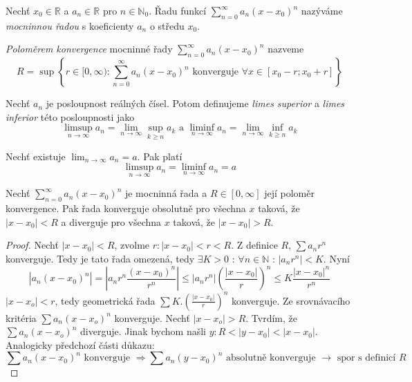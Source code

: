 \begin{definice}
Nechť $x_0 \in \mathbb{R}$ a $a_n \in \mathbb{R}$ pro $n \in \mathbb{N}_0$. Řadu funkcí $\sum_{n=0}^{\infty} a_n (x-x_0)^n$ nazýváme \emph{mocninnou řadou} s koeficienty $a_n$ o středu $x_0$.
\end{definice}

\begin{definice}
\emph{Poloměrem konvergence} mocninné řady $\sum_{n=0}^{\infty} a_n (x-x_0)^n$ nazveme $$R = \sup \left\{ r \in [ 0,\infty ) : \sum_{n=0}^{\infty}  a_n ( x - x_0 )^n \textrm{ konverguje } \forall x \in [ x_0 - r; x_0 + r ] \right\}$$
\end{definice}

\begin{definice}
Nechť $a_n$ je posloupnost reálných čísel. Potom definujeme \emph{limes superior} a \emph{limes inferior} této posloupnosti jako
$$\limsup_{n \to \infty} a_n = \lim_{n \to \infty} \sup_{k \geq n} a_k \textrm{ a } \liminf_{n \to \infty} a_n = \lim_{n \to \infty} \inf_{k \geq n} a_k$$
\end{definice}

\begin{poznamka}
Nechť existuje $\lim_{n \to \infty} a_n = a$. Pak platí
$$\limsup_{n \to \infty} a_n = \liminf_{n \to \infty} a_n = a$$
\end{poznamka}

\begin{vetal}
\label{o poloměru konvergence mocninné řady}
Nechť $\sum_{n=0}^{\infty} a_n (x-x_0)^n$ je mocninná řada a $R \in [ 0, \infty ]$ její poloměr konvergence. Pak řada konverguje obsolutně pro všechna $x$ taková, že $| x - x_0| < R$ a diverguje pro všechna $x$ taková, že $| x - x_0 | > R$.
\end{vetal}

\begin{proof}
Nechť $|x-x_0|<R$, zvolme $r: |x-x_0|<r<R$. Z definice $R$, $\sum a_nr^n$ konverguje. Tedy je tato řada omezená, tedy $\exists K>0 \textrm{ : } \forall n \in \mathbb{N} \textrm{ : } |a_nr^n|<K$.
Nyní
$$|a_n(x-x_0)^n| = \left| a_n r^n \frac{(x-x_0)^n}{r^n} \right| \leq |a_nr^n| \left( \frac{|x-x_0|}{r} \right)^n \leq K \frac{|x-x_0|^n}{r^n} $$
$|x-x_o|<r$, tedy geometrická řada $\sum K. \left( \frac{|x-x_0|}{r} \right)^n$ konverguje. Ze srovnávacího kritéria $\sum a_n(x-x_o)^n$ konverguje.
Nechť $|x-x_o|>R$. Tvrdím, že $\sum a_n(x-x_o)^n$ diverguje. Jinak bychom našli $y: R< |y-x_0| < |x-x_0|$. Analogicky předchozí části důkazu:
$$\sum a_n(x-x_0)^n \textrm{ konverguje } \Rightarrow \sum a_n(y-x_0)^n \textrm{ absolutně konverguje } \rightarrow \textrm{ spor s definicí } R$$
\end{proof}

